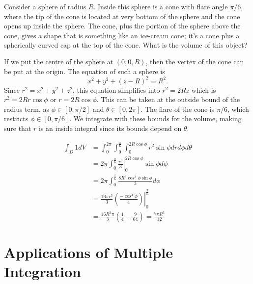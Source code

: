\documentclass[fleqn,letterpaper]{report}
\begin{document}
\begin{example}
Consider a sphere of radius $R$. Inside this sphere is a cone
with flare angle $\pi/6$, where the tip of the cone is located
at very bottom of the sphere and the cone opens up inside the
sphere. The cone, plus the portion of the sphere above the
cone, gives a shape that is something like an ice-cream cone;
it's a cone plus a spherically curved cap at the top of the
cone. What is the volume of this object?

If we put the centre of the sphere at $(0,0,R)$, then the
vertex of the cone can be put at the origin. The equation of
such a sphere is
\begin{equation*}
x^2+ y^2 + (z-R)^2 = R^2.
\end{equation*}
Since $r^2 = x^2 + y^2 + z^2$, this equation simplifies into
$r^2 = 2 R z$ which is $r^2 = 2Rr\cos \phi$ or $r = 2R\cos
\phi$. This can be taken at the outside bound of the radius
term, as $\phi \in [0,\pi/2]$ and $\theta \in [0, 2\pi]$. The
flare of the cone is $\pi/6$, which restricts $\phi \in [0,
\pi/6]$. We integrate with these bounds for the volume, making
sure that $r$ is an inside integral since its bounds depend on
$\theta$.

\begin{align*}
\int_D 1 dV & = \int_0^{2\pi} \int_0^{\frac{\pi}{6}} \int_0^{2
R \cos \phi} r^2 \sin \phi dr d\phi d\theta \\
& = 2\pi \int_0^{\frac{\pi}{6}} \left. \frac{r^3}{3}
\right|_0^{2R\cos \phi} \sin \phi d \phi \\
& = 2\pi \int_0^{\frac{\pi}{6}} \frac{8R^3 \cos^3 \phi \sin
\phi}{3} d\phi \\
& = \frac{16\pi r^3}{3} \left. \left( \frac{-\cos^4\phi}{4}
\right) \right|_0^{\frac{\pi}{6}} \\
& = \frac{16R^3\pi}{3} \left( \frac{1}{4} - \frac{9}{64}
\right) = \frac{7\pi R^3}{12}
\end{align*}
\end{example}

\section{Applications of Multiple Integration}
\label{applications}
\end{document}
